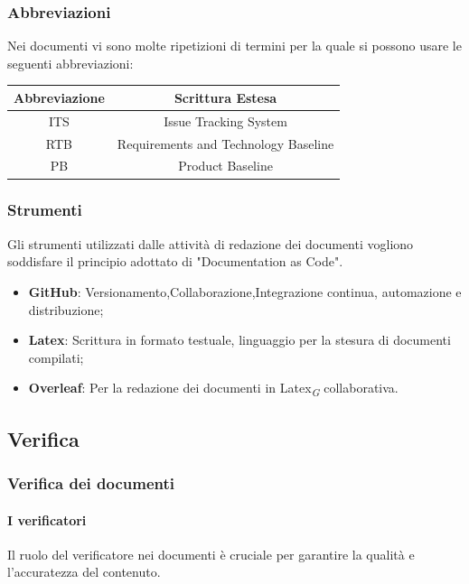 \documentclass{article}
\begin{document}
    \subsubsection{Abbreviazioni}
    Nei documenti vi sono molte ripetizioni di termini per la quale si possono usare le seguenti abbreviazioni:\\
    \vspace{0.2cm}
    \begin{tabular}{|c|c|}
  \hline
  \textbf{Abbreviazione} & \textbf{Scrittura Estesa} \\
  \hline
  ITS & Issue Tracking System \\
  RTB & Requirements and Technology Baseline  \\
  PB & Product Baseline\\
  \hline
\end{tabular}

\subsubsection{Strumenti}
    Gli strumenti utilizzati dalle attività di redazione dei documenti vogliono soddisfare il principio adottato di "Documentation as Code".
    \begin{itemize}
        \item \textbf{GitHub}: Versionamento,Collaborazione,Integrazione continua, automazione e distribuzione;
        \item \textbf{Latex}: Scrittura in formato testuale, linguaggio per la stesura di documenti compilati;
        \item \textbf{Overleaf}: Per la redazione dei documenti in Latex\textsubscript{\textit{G}} collaborativa.
    \end{itemize}

\subsection{Verifica}
\subsubsection{Verifica dei documenti}
\paragraph{I verificatori}\label{sec:verificatori}

    Il ruolo del verificatore nei documenti è cruciale per garantire la qualità e l'accuratezza del contenuto.
\end{document}
